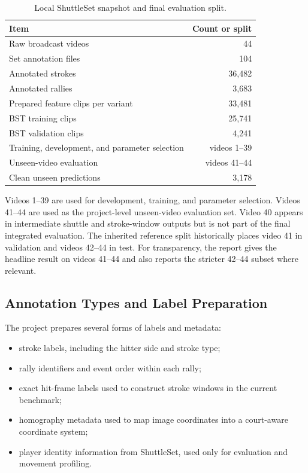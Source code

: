 \documentclass{article}
\begin{document}
\begin{table}[t]
  \caption{Local ShuttleSet snapshot and final evaluation split.}
  \label{tab:data}
  \centering
  \small
  \begin{tabular}{lr}
    \toprule
    Item & Count or split \\
    \midrule
    Raw broadcast videos & 44 \\
    Set annotation files & 104 \\
    Annotated strokes & 36,482 \\
    Annotated rallies & 3,683 \\
    Prepared feature clips per variant & 33,481 \\
    BST training clips & 25,741 \\
    BST validation clips & 4,241 \\
    Training, development, and parameter selection & videos 1--39 \\
    Unseen-video evaluation & videos 41--44 \\
    Clean unseen predictions & 3,178 \\
    \bottomrule
  \end{tabular}
\end{table}

Videos 1--39 are used for development, training, and parameter selection.
Videos 41--44 are used as the project-level unseen-video evaluation set. Video
40 appears in intermediate shuttle and stroke-window outputs but is not part
of the final integrated evaluation. The inherited reference split historically
places video 41 in validation and videos 42--44 in test. For transparency, the
report gives the headline result on videos 41--44 and also reports the
stricter 42--44 subset where relevant.

\subsection{Annotation Types and Label Preparation}

The project prepares several forms of labels and metadata:
\begin{itemize}[leftmargin=*,nosep]
  \item stroke labels, including the hitter side and stroke type;
  \item rally identifiers and event order within each rally;
  \item exact hit-frame labels used to construct stroke windows in the current
  benchmark;
  \item homography metadata used to map image coordinates into a court-aware
  coordinate system;
  \item player identity information from ShuttleSet, used only for evaluation
  and movement profiling.
\end{itemize}
\end{document}
